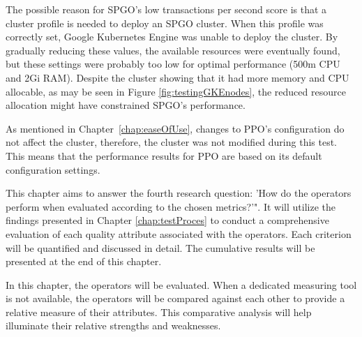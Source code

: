 The possible reason for SPGO's low transactions per second score is that a cluster profile is needed to deploy an SPGO cluster. When this profile was correctly set, Google Kubernetes Engine was unable to deploy the cluster. By gradually reducing these values, the available resources were eventually found, but these settings were probably too low for optimal performance (500m CPU and 2Gi RAM). Despite the cluster showing that it had more memory and CPU allocable, as may be seen in Figure \ref{fig:testingGKEnodes}, the reduced resource allocation might have constrained SPGO's performance.

As mentioned in Chapter~\ref{chap:easeOfUse}, changes to PPO's configuration do not affect the cluster, therefore, the cluster was not modified during this test. This means that the performance results for PPO are based on its default configuration settings.





This chapter aims to answer the fourth research question: ’How do the operators perform when evaluated according to the chosen metrics?’".
It will utilize the findings presented in Chapter \ref{chap:testProces} to conduct a comprehensive evaluation of each quality attribute associated with the operators.
Each criterion will be quantified and discussed in detail.
The cumulative results will be presented at the end of this chapter.

In this chapter, the operators will be evaluated. When a dedicated measuring tool is not available, the operators will be compared against each other to provide a relative measure of their attributes.
This comparative analysis will help illuminate their relative strengths and weaknesses.

